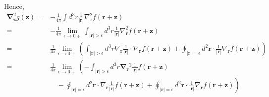 \documentclass{article}
\begin{document}
Hence,
$$
\begin{align*}
\boldsymbol{\nabla}_{\boldsymbol{z}}^{2} g(\boldsymbol{z})= & -\frac{1}{4 \pi} \int d^{3} r \frac{1}{|\boldsymbol{r}|} \nabla_{z}^{2} f(\boldsymbol{r}+\boldsymbol{z})  \tag{3.9.22}\\
= & -\frac{1}{4 \pi} \lim _{\epsilon \rightarrow 0+} \int_{|\boldsymbol{r}|>\epsilon} d^{3} r \frac{1}{|\boldsymbol{r}|} \nabla_{\boldsymbol{r}}^{2} f(\boldsymbol{r}+\boldsymbol{z}) \\
= & \frac{1}{4 \pi} \lim _{\epsilon \rightarrow 0+}\left(\int_{|\boldsymbol{r}|>\epsilon} d^{3} r \nabla_{\boldsymbol{r}} \frac{1}{|\boldsymbol{r}|} \cdot \nabla_{\boldsymbol{r}} f(\boldsymbol{r}+\boldsymbol{z})+\oint_{|\boldsymbol{r}|=\epsilon} d^{2} \boldsymbol{r} \cdot \frac{1}{|\boldsymbol{r}|} \nabla_{\boldsymbol{r}} f(\boldsymbol{r}+\boldsymbol{z})\right) \\
= & \frac{1}{4 \pi} \lim _{\epsilon \rightarrow 0+}\left(-\int_{|\boldsymbol{r}|>\epsilon} d^{3} r \boldsymbol{\nabla}_{\boldsymbol{r}}{ }^{2} \frac{1}{|\boldsymbol{r}|} f(\boldsymbol{r}+\boldsymbol{z})\right. \\
& \left.\quad-\oint_{|\boldsymbol{r}|=\epsilon} d^{2} \boldsymbol{r} \cdot \nabla_{\boldsymbol{r}} \frac{1}{|\boldsymbol{r}|} f(\boldsymbol{r}+\boldsymbol{z})+\oint_{|\boldsymbol{r}|=\epsilon} d^{2} \boldsymbol{r} \cdot \frac{1}{|\boldsymbol{r}|} \nabla_{\boldsymbol{r}} f(\boldsymbol{r}+\boldsymbol{z})\right)
\end{align*}
$$
\end{document}

